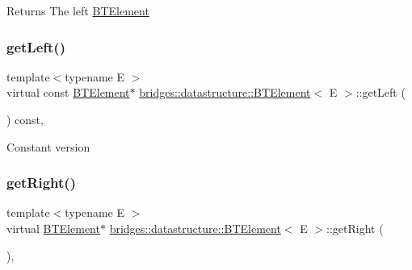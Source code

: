\begin{DoxyReturn}{Returns}
The left \hyperlink{classbridges_1_1datastructure_1_1_b_t_element}{B\+T\+Element} 
\end{DoxyReturn}
\mbox{\label{classbridges_1_1datastructure_1_1_b_t_element_aa13df422de48c6297223c3c28caf9277}} 
\subsubsection{\texorpdfstring{get\+Left()}{getLeft()}\hspace{0.1cm}{\footnotesize\ttfamily [2/2]}}
{\footnotesize\ttfamily template$<$typename E $>$ \\
virtual const \hyperlink{classbridges_1_1datastructure_1_1_b_t_element}{B\+T\+Element}$\ast$ \hyperlink{classbridges_1_1datastructure_1_1_b_t_element}{bridges\+::datastructure\+::\+B\+T\+Element}$<$ E $>$\+::get\+Left (\begin{DoxyParamCaption}{ }\end{DoxyParamCaption}) const\hspace{0.3cm}{\ttfamily [inline]}, {\ttfamily [virtual]}}

Constant version \mbox{\label{classbridges_1_1datastructure_1_1_b_t_element_a3f73fcc5a7ed1af1a628803879682f80}} 
\subsubsection{\texorpdfstring{get\+Right()}{getRight()}\hspace{0.1cm}{\footnotesize\ttfamily [1/2]}}
{\footnotesize\ttfamily template$<$typename E $>$ \\
virtual \hyperlink{classbridges_1_1datastructure_1_1_b_t_element}{B\+T\+Element}$\ast$ \hyperlink{classbridges_1_1datastructure_1_1_b_t_element}{bridges\+::datastructure\+::\+B\+T\+Element}$<$ E $>$\+::get\+Right (\begin{DoxyParamCaption}{ }\end{DoxyParamCaption})\hspace{0.3cm}{\ttfamily [inline]}, {\ttfamily [virtual]}}

